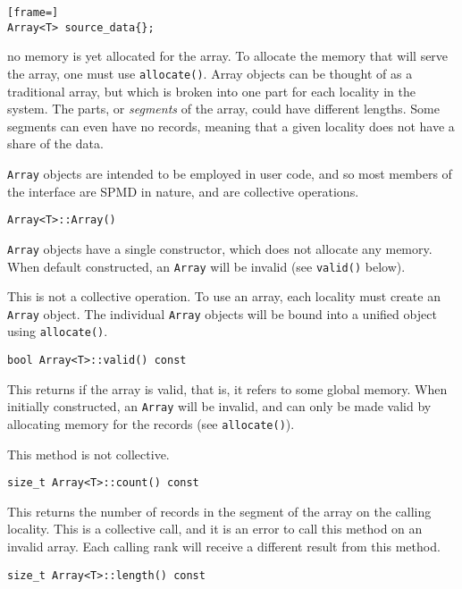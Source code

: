 \begin{lstlisting}[frame=]
Array<T> source_data{};
\end{lstlisting}

\noindent no memory is yet allocated for the array. To allocate the
memory that will serve the array, one must use \texttt{allocate()}.
Array objects can be thought of as a traditional array,
but which is broken into one part for each locality in the system. The parts,
or \emph{segments} of the array, could have different lengths. Some segments can
even have no records, meaning that a given locality does not have a share of
the data.

\texttt{Array} objects are intended to be employed in user code, and so most
members of the interface are SPMD in nature, and are collective operations.

\begin{lstlisting}
Array<T>::Array()
\end{lstlisting}

\noindent \texttt{Array} objects have a single constructor, which does not
allocate any
memory. When default constructed, an \texttt{Array} will be invalid (see
\texttt{valid()} below).

This is not a collective operation. To use an array, each locality must create
an \texttt{Array} object. The individual \texttt{Array} objects will be bound
into a unified object using \texttt{allocate()}.

\begin{lstlisting}
bool Array<T>::valid() const
\end{lstlisting}

\noindent This returns if the array is valid, that is, it refers to some global
memory.
When initially constructed, an \texttt{Array} will be invalid, and can only be
made valid by allocating memory for the records (see \texttt{allocate()}).

This method is not collective.

\begin{lstlisting}
size_t Array<T>::count() const
\end{lstlisting}

\noindent This returns the number of records in the segment of the array on the
calling
locality. This is a collective call, and it is an error to call this method
on an invalid array. Each calling rank will receive a different result from
this method.

\begin{lstlisting}
size_t Array<T>::length() const
\end{lstlisting}

